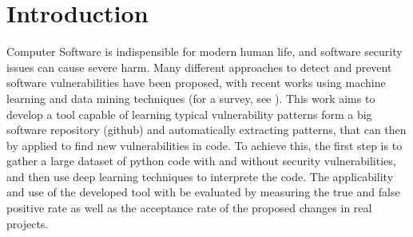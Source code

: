 \documentclass[
	a4paper,
	pagesize,
	pdftex,
	12pt,
	twoside, %
	BCOR=5mm, %
	ngerman,
	fleqn,
	final,
	]{scrartcl}
\begin{document}

\mitverteidigung %
\makeTitel
\tableofcontents
\newpage

\section{Introduction}
Computer Software is indispensible for modern human life, and software security issues can cause severe harm. Many different approaches to detect and prevent software vulnerabilities have been proposed, with recent works using machine learning and data mining techniques (for a survey, see \citep{Ghaffarian.2017}). This work aims to develop a tool capable of learning typical vulnerability patterns form a big software repository (github) and automatically extracting patterns, that can then by applied to find new vulnerabilities in code. To achieve this, the first step is to gather a large dataset of python code with and without security vulnerabilities, and then use deep learning techniques to interprete the code. The applicability and use of the developed tool with be evaluated by measuring the true and false positive rate as well as the acceptance rate of the proposed changes in real projects. 
\end{document}
